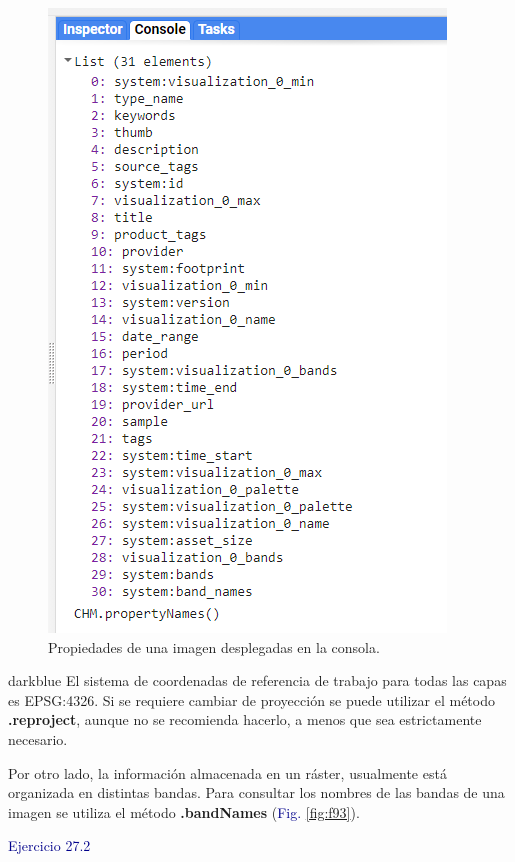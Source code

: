 \documentclass[
  12pt,
  letterpaper,
  twoside]{book}
\newcommand\boldpurple[1]{\textcolor{darkpurple}{\textbf{#1}}}
\begin{document}
\begin{figure}[H]

{\centering \includegraphics[width=0.6\linewidth]{Img/ej272} 

}

\caption{Propiedades de una imagen desplegadas en la consola.}\label{fig:f92}
\end{figure}

\begin{bluebox2}

\begin{awesomeblock}{5pt}{\faLightbulb}{darkblue}
El sistema de coordenadas de referencia de trabajo para todas las capas es EPSG:4326. Si se requiere cambiar de proyección se puede utilizar el método \boldpurple{.reproject}, aunque no se recomienda hacerlo, a menos que sea estrictamente necesario.

\end{awesomeblock}

\end{bluebox2}

Por otro lado, la información almacenada en un ráster, usualmente está organizada en distintas bandas. Para consultar los nombres de las bandas de una imagen se utiliza el método \boldpurple{.bandNames} (\textcolor{darkblue}{Fig.} \ref{fig:f93}).

\newpage

\textcolor{darkblue}{Ejercicio 27.2}
\end{document}
